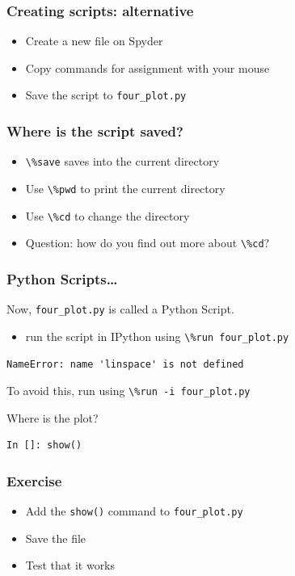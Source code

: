 \documentclass[14pt,compress]{beamer}
\newcounter{time}
\newcommand{\inctime}[1]{\addtocounter{time}{#1}{\tiny \thetime\ m}}
\newcommand{\typ}[1]{\lstinline{#1}}
\begin{document}
\begin{frame}[fragile]
  \frametitle{Creating scripts: alternative}
  \begin{itemize}
  \item Create a new file on Spyder
  \item Copy commands for assignment with your mouse
  \item Save the script to \typ{four_plot.py}
  \end{itemize}
\end{frame}

\begin{frame}[fragile]
  \frametitle{Where is the script saved?}
  \begin{itemize}
  \item \typ{\%save} saves into the current directory
    \vspace*{0.5in}
  \item Use \typ{\%pwd} to print the current directory
  \item Use \typ{\%cd} to change the directory

    \vspace*{0.5in}
  \item Question: how do you find out more about \typ{\%cd}?
  \end{itemize}
\end{frame}


\begin{frame}[fragile]
\frametitle{Python Scripts\ldots}
Now, \typ{four_plot.py} is called a Python Script.
 \begin{itemize}
 \item run the script in IPython using \typ{\%run four_plot.py}\\
 \end{itemize}
\pause
\alert{\typ{NameError: name 'linspace' is not defined}}
\begin{block}{}
To avoid this, run using \alert{\typ{\%run -i four_plot.py}}\\
\end{block}
\pause
Where is the plot?
\begin{lstlisting}
In []: show()
\end{lstlisting}
\end{frame}

\begin{frame}[fragile]
  \frametitle{Exercise}
  \begin{itemize}
  \item Add the \typ{show()} command to \typ{four_plot.py}
  \item Save the file
  \item Test that it works
  \end{itemize}
  \inctime{5}
\end{frame}
\end{document}

